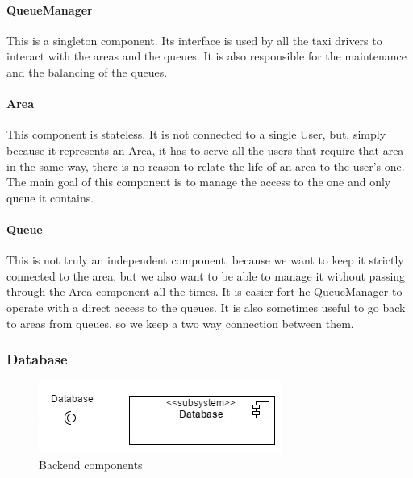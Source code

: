		\paragraph{QueueManager}
		This is a singleton component. Its interface is used by all the taxi drivers to interact with the areas and
		the queues. It is also responsible for the maintenance and the balancing of the queues.
		\paragraph{Area}
		This component is stateless. It is not connected to a single User, but, simply because it represents an Area,
		it has to serve all the users that require that area in the same way, there is no reason to relate the
		life of an area to the user's one. The main goal of this component is to manage the access to the one and
		only queue it contains.
		\paragraph{Queue}
		This is not truly an independent component, because we want to keep it strictly connected to the area,
		but we also want to be able to manage it without passing through the Area component all the times.
		It is easier fort he QueueManager to operate with a direct access to the queues.
		It is also sometimes useful to go back to areas from queues, so we keep a two way connection between them.
	\subsubsection{Database}
		\begin{figure}[h!]
			\begin{center}
				\includegraphics[scale=1]{../SE2_IMAGES/Database}
				\caption{Backend components}
			\end{center}
		\end{figure}
